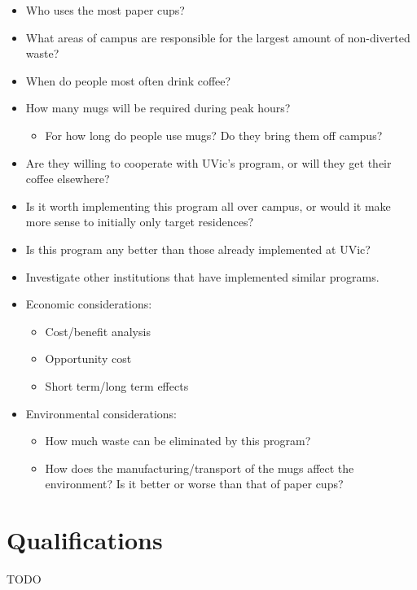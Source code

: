 \documentclass[letterpaper,11pt]{texMemo}
\begin{document}
\begin{itemize}
	\item Who uses the most paper cups?
	\item What areas of campus are responsible for the largest amount of
		non-diverted waste?\\

	\item When do people most often drink coffee?
	\item How many mugs will be required during peak hours?
	\begin{itemize}
		\item For how long do people use mugs? Do they bring them off campus?
	\end{itemize}
	\item Are they willing to cooperate with UVic's program, or will they
		get their coffee elsewhere?\\

	\item Is it worth implementing this program all over campus, or would it
		make more sense to initially only target residences?
	\item Is this program any better than those already implemented at UVic?
	\item Investigate other institutions that have implemented similar
		programs.\\

	\item Economic considerations:
	\begin{itemize}
		\item Cost/benefit analysis
		\item Opportunity cost
		\item Short term/long term effects
	\end{itemize}
	\item Environmental considerations:
	\begin{itemize}
		\item How much waste can be eliminated by this program?
		\item How does the manufacturing/transport of the mugs affect the
			environment? Is it better or worse than that of paper cups?
	\end{itemize}

\end{itemize}
\section*{Qualifications}
TODO
\end{document}
